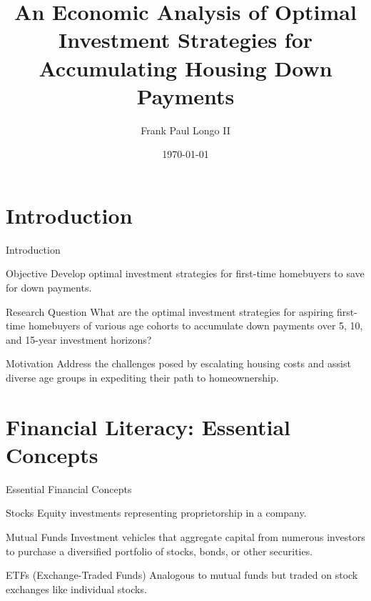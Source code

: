 \documentclass{beamer}
\title{An Economic Analysis of Optimal Investment Strategies for Accumulating Housing Down Payments}
\author{Frank Paul Longo II}
\date{\today}
\begin{document}
\begin{frame}
    \titlepage
\end{frame}

\section{Introduction}
\begin{frame}{Introduction}
    \begin{block}{Objective}
        Develop optimal investment strategies for first-time homebuyers to save for down payments.
    \end{block}
    \begin{block}{Research Question}
        What are the optimal investment strategies for aspiring first-time homebuyers of various age cohorts to accumulate down payments over 5, 10, and 15-year investment horizons?
    \end{block}
    \begin{block}{Motivation}
        Address the challenges posed by escalating housing costs and assist diverse age groups in expediting their path to homeownership.
    \end{block}
\end{frame}

\section{Financial Literacy: Essential Concepts}
\begin{frame}{Essential Financial Concepts}
    \begin{block}{Stocks}
        Equity investments representing proprietorship in a company.
    \end{block}
    \begin{block}{Mutual Funds}
        Investment vehicles that aggregate capital from numerous investors to purchase a diversified portfolio of stocks, bonds, or other securities.
    \end{block}
    \begin{block}{ETFs (Exchange-Traded Funds)}
        Analogous to mutual funds but traded on stock exchanges like individual stocks.
    \end{block}
\end{frame}
\end{document}
